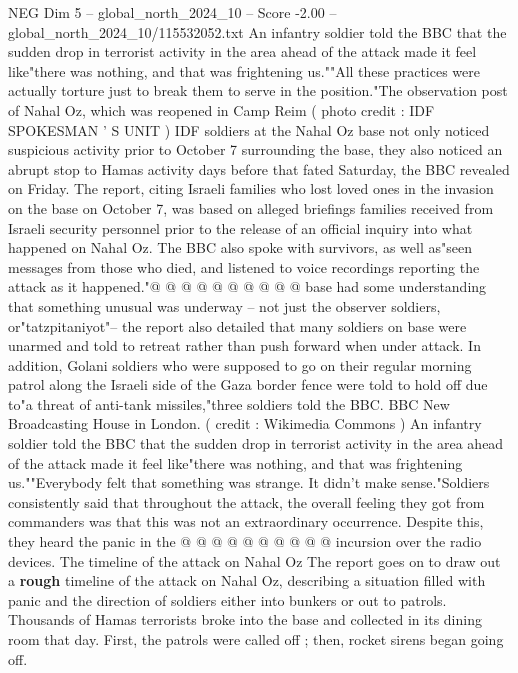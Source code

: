 \begin{textsample}{NEG Dim 5 – global\_north\_2024\_10 – Score -2.00 – global\_north\_2024\_10/115532052.txt}  \label{ex:f5_neg_050}
An infantry soldier told the BBC that the sudden drop in terrorist activity in the area ahead of the attack made it feel like"there was nothing, and that was frightening us.""All these practices were actually torture just to break them to serve in the position."The observation post of Nahal Oz, which was reopened in Camp Reim ( photo credit : IDF SPOKESMAN ' S UNIT ) IDF soldiers at the Nahal Oz base not only noticed suspicious activity prior to October 7 surrounding the base, they also noticed an abrupt stop to Hamas activity days before that fated Saturday, the BBC revealed on Friday.
The report, citing Israeli families who lost loved ones in the invasion on the base on October 7, was based on alleged briefings families received from Israeli security personnel prior to the release of an official inquiry into what happened on Nahal Oz.
The BBC also spoke with survivors, as well as"seen messages from those who died, and listened to voice recordings reporting the attack as it happened."@ @ @ @ @ @ @ @ @ @ base had some understanding that something unusual was underway -- not just the observer soldiers, or"tatzpitaniyot"-- the report also detailed that many soldiers on base were unarmed and told to retreat rather than push forward when under attack.
In addition, Golani soldiers who were supposed to go on their regular morning patrol along the Israeli side of the Gaza border fence were told to hold off due to"a threat of anti-tank missiles,"three soldiers told the BBC.
BBC New Broadcasting House in London. ( credit : Wikimedia Commons ) An infantry soldier told the BBC that the sudden drop in terrorist activity in the area ahead of the attack made it feel like"there was nothing, and that was frightening us.""Everybody felt that something was strange.
It didn't make sense."Soldiers consistently said that throughout the attack, the overall feeling they got from commanders was that this was not an extraordinary occurrence.
Despite this, they heard the panic in the @ @ @ @ @ @ @ @ @ @ incursion over the radio devices.
The timeline of the attack on Nahal Oz The report goes on to draw out a \textbf{rough} timeline of the attack on Nahal Oz, describing a situation filled with panic and the direction of soldiers either into bunkers or out to patrols.
Thousands of Hamas terrorists broke into the base and collected in its dining room that day.
First, the patrols were called off ; then, rocket sirens began going off.

\end{textsample}
